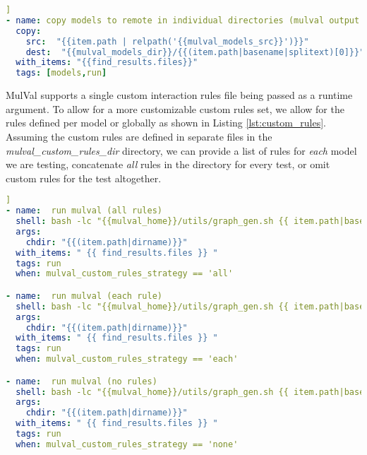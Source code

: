 \begin{lstlisting}[language=yaml, label={lst:model_dirs}, caption={MulVal distinct run dirs},captionpos=b,  linewidth=.45\textwidth, xleftmargin=20pt]]
- name: copy models to remote in individual directories (mulval output is noisy)
  copy:
    src:  "{{item.path | relpath('{{mulval_models_src}}')}}"
    dest:  "{{mulval_models_dir}}/{{(item.path|basename|splitext)[0]}}"
  with_items: "{{find_results.files}}"
  tags: [models,run]
\end{lstlisting}

MulVal supports a single custom interaction rules file being passed as a runtime argument. To allow for a more customizable custom rules set, we allow for the rules defined per model or globally as shown in Listing \ref{lst:custom_rules}. Assuming the custom rules are defined in separate files in the \textit{mulval\_custom\_rules\_dir} directory, we can provide a list of rules for \textit{each} model we are testing, concatenate \textit{all} rules in the directory for every test, or omit custom rules for the test altogether.

\begin{lstlisting}[language=yaml, label={lst:custom_rules}, caption={MulVal custom rule strategies},captionpos=b, linewidth=.45\textwidth, xleftmargin=20pt]]
- name:  run mulval (all rules)
  shell: bash -lc "{{mulval_home}}/utils/graph_gen.sh {{ item.path|basename }} -p -v -a {{mulval_custom_rules_dir}}/custom_rules.P "
  args:
    chdir: "{{(item.path|dirname)}}"
  with_items: " {{ find_results.files }} "
  tags: run
  when: mulval_custom_rules_strategy == 'all'

- name:  run mulval (each rule)
  shell: bash -lc "{{mulval_home}}/utils/graph_gen.sh {{ item.path|basename }} -p -v -a {{mulval_custom_rules_dir}}/{{ item.path|basename }}.rules  "
  args:
    chdir: "{{(item.path|dirname)}}"
  with_items: " {{ find_results.files }} "
  tags: run
  when: mulval_custom_rules_strategy == 'each'

- name:  run mulval (no rules)
  shell: bash -lc "{{mulval_home}}/utils/graph_gen.sh {{ item.path|basename }} -p -v"
  args:
    chdir: "{{(item.path|dirname)}}"
  with_items: " {{ find_results.files }} "
  tags: run
  when: mulval_custom_rules_strategy == 'none'
\end{lstlisting}

